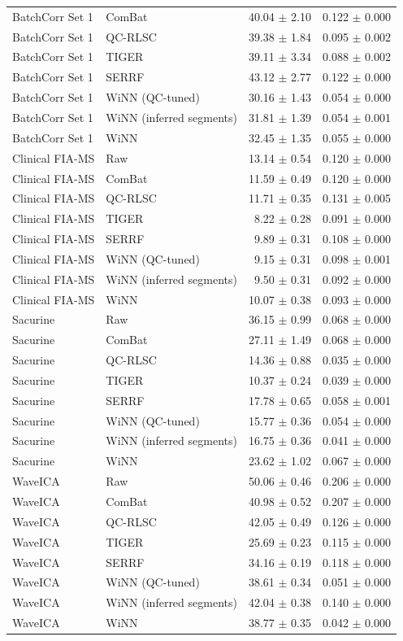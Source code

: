 \begin{longtable}{llrr}
BatchCorr Set 1 & ComBat & 40.04 $\pm$ 2.10 & 0.122 $\pm$ 0.000 \\
BatchCorr Set 1 & QC-RLSC & 39.38 $\pm$ 1.84 & 0.095 $\pm$ 0.002 \\
BatchCorr Set 1 & TIGER & 39.11 $\pm$ 3.34 & 0.088 $\pm$ 0.002 \\
BatchCorr Set 1 & SERRF & 43.12 $\pm$ 2.77 & 0.122 $\pm$ 0.000 \\
BatchCorr Set 1 & WiNN (QC-tuned) & 30.16 $\pm$ 1.43 & 0.054 $\pm$ 0.000 \\
BatchCorr Set 1 & WiNN (inferred segments) & 31.81 $\pm$ 1.39 & 0.054 $\pm$ 0.001 \\
BatchCorr Set 1 & WiNN & 32.45 $\pm$ 1.35 & 0.055 $\pm$ 0.000 \\
Clinical FIA-MS & Raw & 13.14 $\pm$ 0.54 & 0.120 $\pm$ 0.000 \\
Clinical FIA-MS & ComBat & 11.59 $\pm$ 0.49 & 0.120 $\pm$ 0.000 \\
Clinical FIA-MS & QC-RLSC & 11.71 $\pm$ 0.35 & 0.131 $\pm$ 0.005 \\
Clinical FIA-MS & TIGER & 8.22 $\pm$ 0.28 & 0.091 $\pm$ 0.000 \\
Clinical FIA-MS & SERRF & 9.89 $\pm$ 0.31 & 0.108 $\pm$ 0.000 \\
Clinical FIA-MS & WiNN (QC-tuned) & 9.15 $\pm$ 0.31 & 0.098 $\pm$ 0.001 \\
Clinical FIA-MS & WiNN (inferred segments) & 9.50 $\pm$ 0.31 & 0.092 $\pm$ 0.000 \\
Clinical FIA-MS & WiNN & 10.07 $\pm$ 0.38 & 0.093 $\pm$ 0.000 \\
Sacurine & Raw & 36.15 $\pm$ 0.99 & 0.068 $\pm$ 0.000 \\
Sacurine & ComBat & 27.11 $\pm$ 1.49 & 0.068 $\pm$ 0.000 \\
Sacurine & QC-RLSC & 14.36 $\pm$ 0.88 & 0.035 $\pm$ 0.000 \\
Sacurine & TIGER & 10.37 $\pm$ 0.24 & 0.039 $\pm$ 0.000 \\
Sacurine & SERRF & 17.78 $\pm$ 0.65 & 0.058 $\pm$ 0.001 \\
Sacurine & WiNN (QC-tuned) & 15.77 $\pm$ 0.36 & 0.054 $\pm$ 0.000 \\
Sacurine & WiNN (inferred segments) & 16.75 $\pm$ 0.36 & 0.041 $\pm$ 0.000 \\
Sacurine & WiNN & 23.62 $\pm$ 1.02 & 0.067 $\pm$ 0.000 \\
WaveICA & Raw & 50.06 $\pm$ 0.46 & 0.206 $\pm$ 0.000 \\
WaveICA & ComBat & 40.98 $\pm$ 0.52 & 0.207 $\pm$ 0.000 \\
WaveICA & QC-RLSC & 42.05 $\pm$ 0.49 & 0.126 $\pm$ 0.000 \\
WaveICA & TIGER & 25.69 $\pm$ 0.23 & 0.115 $\pm$ 0.000 \\
WaveICA & SERRF & 34.16 $\pm$ 0.19 & 0.118 $\pm$ 0.000 \\
WaveICA & WiNN (QC-tuned) & 38.61 $\pm$ 0.34 & 0.051 $\pm$ 0.000 \\
WaveICA & WiNN (inferred segments) & 42.04 $\pm$ 0.38 & 0.140 $\pm$ 0.000 \\
WaveICA & WiNN & 38.77 $\pm$ 0.35 & 0.042 $\pm$ 0.000 \\
\end{longtable}
